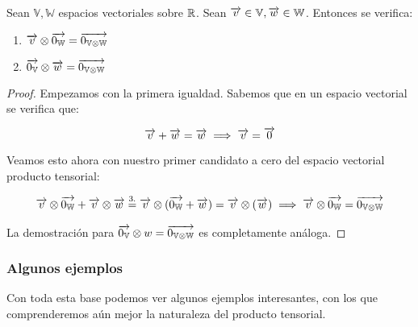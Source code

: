 \begin{proposicion}
    Sean $\mathbb{V}, \mathbb{W}$ espacios vectoriales sobre $\mathbb{R}$. Sean $\overrightarrow{v} \in \mathbb{V}, \overrightarrow{w} \in \mathbb{W}$. Entonces se verifica:

    \begin{enumerate}
        \item $\overrightarrow{v} \otimes \overrightarrow{0_\mathbb{W}} = \overrightarrow{0_{\mathbb{V} \otimes \mathbb{W}}}$
        \item $\overrightarrow{0_{\mathbb{V}}} \otimes \overrightarrow{w} = \overrightarrow{0_{\mathbb{V} \otimes \mathbb{W}}}$
    \end{enumerate}
\end{proposicion}
\begin{proof}
    Empezamos con la primera igualdad. Sabemos que en un espacio vectorial se verifica que:

    \begin{equation} \label{eq:dem_tensor_cero}
        \overrightarrow{v} + \overrightarrow{w} = \overrightarrow{w} \implies \overrightarrow{v} = \overrightarrow{0}
    \end{equation}

    Veamos esto ahora con nuestro primer candidato a cero del espacio vectorial producto tensorial:

    \begin{equation}
    \begin{split}
        \overrightarrow{v} \otimes \overrightarrow{0_\mathbb{W}} + \overrightarrow{v} \otimes \overrightarrow{w} \stackrel{\text{3.}}{=} \overrightarrow{v} \otimes (\overrightarrow{0_\mathbb{W}} + \overrightarrow{w}) = \overrightarrow{v} \otimes (\overrightarrow{w}) \implies \overrightarrow{v} \otimes \overrightarrow{0_\mathbb{W}} = \overrightarrow{0_{\mathbb{V} \otimes \mathbb{W}}}
    \end{split}
    \end{equation}

    La demostración para $\overrightarrow{0_{\mathbb{V}}} \otimes w = \overrightarrow{0_{\mathbb{V} \otimes \mathbb{W}}}$ es completamente análoga.
\end{proof}

\subsubsection{Algunos ejemplos}

Con toda esta base podemos ver algunos ejemplos interesantes, con los que comprenderemos aún mejor la naturaleza del producto tensorial.

